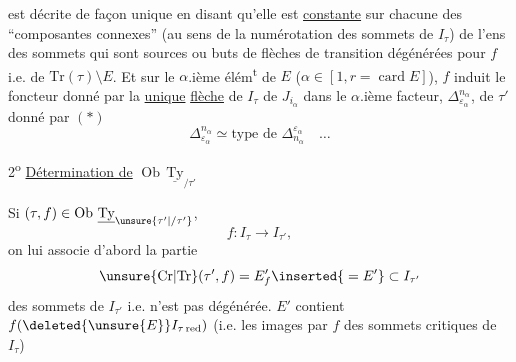 est décrite de façon unique en disant qu'elle est \uline{constante}
sur chacune des ``composantes connexes'' (au sens de
la numérotation des sommets \unsure{\}|)} de $I_\tau$) de l'ens
des sommets qui sont sources ou buts de flèches
de transition dégénérées pour $f$ i.e. de $\mathrm{Tr}(\tau)\setminus E$.
Et sur le $\alpha$.ième élém\textsuperscript{t} de $E$ 
($\alpha\in[1,r=\operatorname{card} E]$), $f$ induit le foncteur
donné par la  \uline{unique} \uline{flèche} de $I_\tau$
de $J_{i_\alpha}$ dans le $\alpha$.ième facteur,  $\Delta_{\varepsilon_\alpha}^{n_\alpha}$, de $\tau'$\unsure{$*$|,}
donné par $(*)$
\[
 \Delta_{\varepsilon_\alpha}^{n_\alpha}\simeq\text{type de }\mathbb{\Delta}_{n_\alpha}^{\varepsilon_\alpha}\quad\ldots
\]

2\textsuperscript{o} \uline{Détermination de} $\operatorname{Ob}\,\underline{\mathrm{Ty}}_{/\tau'}$

Si $(\tau,f)\in\operatorname{Ob}\,\underline{\mathrm{Ty}}_{\unsure{\tau'|/\tau'}}$, 
\[
 f\colon I_\tau\longrightarrow I_{\tau'},
\]
on lui associe  d'abord la partie
\[
 \unsure{\mathrm{Cr}|\mathrm{Tr}}(\tau',f)=E'_f\inserted{{}=E'}\subset I_{\tau'}
\]
 des sommets 
de $I_{\tau'}$ 
i.e.   n'est pas dégénérée.
 $E'$
contient 
$f(\deleted{\unsure{E}} I_{\tau\,\mathrm{red}})$ (i.e.
les images par $f$ des sommets critiques de $I_\tau$)
